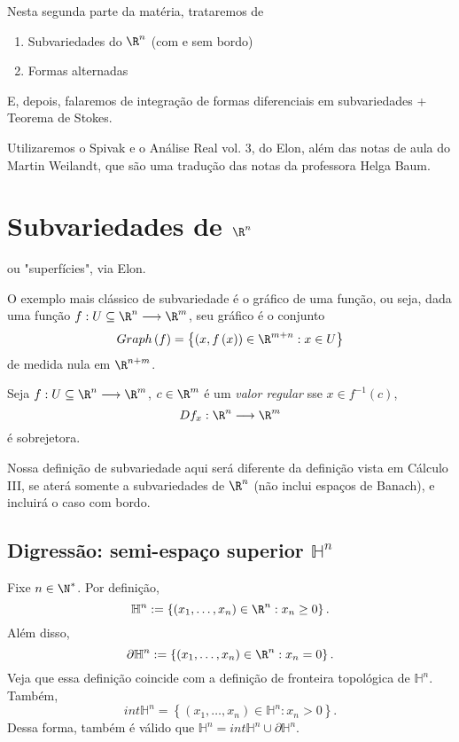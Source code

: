 
Nesta segunda parte da matéria, trataremos de
\begin{enumerate}
    \item Subvariedades do $\R^{n}$ (com e sem bordo)
    \item Formas alternadas
\end{enumerate}

E, depois, falaremos de integração de formas diferenciais em subvariedades + Teorema de Stokes.

Utilizaremos o Spivak e o Análise Real vol. 3, do Elon, além das notas de aula do Martin Weilandt, que são uma tradução das notas da professora Helga Baum.

\section*{Subvariedades de $\R^{n}$}
ou "superfícies", via Elon.

O exemplo mais clássico de subvariedade é o gráfico de uma função, ou seja, dada uma função $f: U\subseteq\R^{n} \longrightarrow \R^{m}$, seu gráfico é o conjunto \[
Graph\left( f \right) = \left\{ \left( x, f\left( x \right)  \right)  \in \R^{m+n} : x\in U\right\} 
\] de medida nula em $\R^{n+m}$.

\begin{definition}
    Seja $f: U\subseteq\R^{n} \longrightarrow \R^{m}$, $c\in \R^{m}$ é um \emph{valor regular} sse $x\in f^{-1}\left( c \right) $, \[
    Df_x: \R^{n} \longrightarrow \R^{m}
    \] é sobrejetora.
\end{definition}

Nossa definição de subvariedade aqui será diferente da definição vista em Cálculo III, se aterá somente a subvariedades de $\R^{n}$ (não inclui espaços de Banach), e incluirá o caso com bordo.

\subsection*{Digressão: semi-espaço superior $\mathbb{H}^{n}$}

Fixe $n\in \N^*$. Por definição, \[
\mathbb{H}^{n} := \left\{ \left( x_1,\ldots,x_n \right) \in \R^{n}: x_n \ge 0 \right\} 
.\] Além disso, \[
\partial \mathbb{H}^{n}:= \left\{ \left( x_1,\ldots,x_n \right) \in \R^{n}: x_n = 0 \right\} 
.\] Veja que essa definição coincide com a definição de fronteira topológica de $\mathbb{H}^{n}$. Também, \[
int \mathbb{H}^{n} = \left\{ \left( x_1,\ldots,x_n \right) \in \mathbb{H}^{n}: x_n > 0 \right\} 
.\] Dessa forma, também é válido que $\mathbb{H}^{n}= int \mathbb{H}^{n} \cup \partial \mathbb{H}^{n}$.

